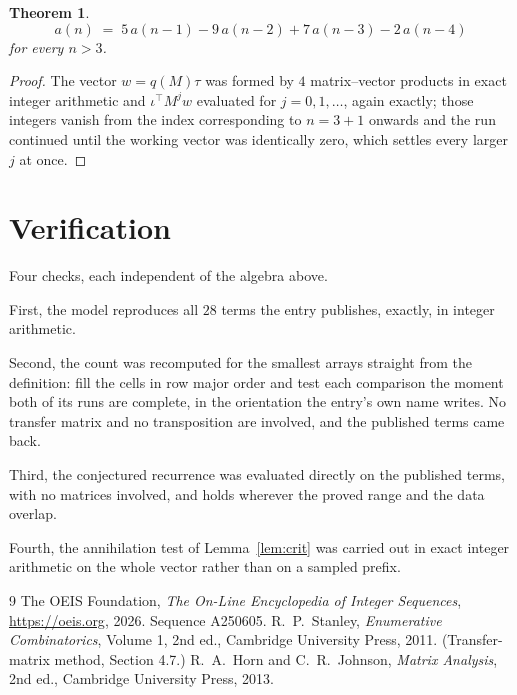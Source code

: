 \documentclass[11pt,a4paper]{article}
\theoremstyle{plain}
\newtheorem{theorem}{Theorem}
\theoremstyle{definition}
\begin{document}
\begin{theorem}
\[
a(n)\;=\;5\,a(n-1) - 9\,a(n-2) + 7\,a(n-3) - 2\,a(n-4)
\]
for every $n>3$.
\end{theorem}

\begin{proof}
The vector $w=q(M)\tau$ was formed by $4$ matrix--vector products in exact integer
arithmetic and $\iota^{\!\top}M^{j}w$ evaluated for $j=0,1,\dots$, again exactly; those
integers vanish from the index corresponding to $n=3+1$ onwards and the run continued
until the working vector was identically zero, which settles every larger $j$ at once.
\end{proof}

\section{Verification}

Four checks, each independent of the algebra above.

First, the model reproduces all $28$ terms the entry publishes, exactly, in integer
arithmetic.

Second, the count was recomputed for the smallest arrays straight from the definition: fill the
cells in row major order and test each comparison the moment both of its runs are complete,
in the orientation the entry's own name writes. No transfer matrix and no transposition are
involved, and the published terms came back.

Third, the conjectured recurrence was evaluated directly on the published terms, with no
matrices involved, and holds wherever the proved range and the data overlap.

Fourth, the annihilation test of Lemma~\ref{lem:crit} was carried out in exact integer
arithmetic on the whole vector rather than on a sampled prefix.

\begin{thebibliography}{9}
 The OEIS Foundation, \emph{The On-Line Encyclopedia of Integer
Sequences}, \url{https://oeis.org}, 2026. Sequence A250605.
 R.~P.~Stanley, \emph{Enumerative Combinatorics}, Volume 1, 2nd ed.,
Cambridge University Press, 2011. (Transfer-matrix method, Section 4.7.)
 R.~A.~Horn and C.~R.~Johnson, \emph{Matrix Analysis}, 2nd ed., Cambridge
University Press, 2013.
\end{thebibliography}
\end{document}

